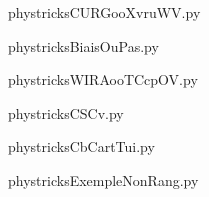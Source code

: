     \newcommand{\CaptionFigCURGooXvruWV}{<+Type your caption here+>}
    \begin{center}
        
    \end{center}
    phystricksCURGooXvruWV.py

    

    \clearpage
    


    \newcommand{\CaptionFigBiaisOuPas}{<+Type your caption here+>}
    \begin{center}
        
    \end{center}
    phystricksBiaisOuPas.py

    

    \clearpage
    


    \newcommand{\CaptionFigWIRAooTCcpOV}{<+Type your caption here+>}
    \begin{center}
        
    \end{center}
    phystricksWIRAooTCcpOV.py

    

    \clearpage
    


    \newcommand{\CaptionFigCSCv}{<+Type your caption here+>}
    \begin{center}
        
    \end{center}
    phystricksCSCv.py

    

    \clearpage
    


    \newcommand{\CaptionFigCbCartTui}{<+Type your caption here+>}
    \begin{center}
        
    \end{center}
    phystricksCbCartTui.py

    

    \clearpage
    


    \newcommand{\CaptionFigExempleNonRang}{<+Type your caption here+>}
    \begin{center}
        
    \end{center}
    phystricksExempleNonRang.py

